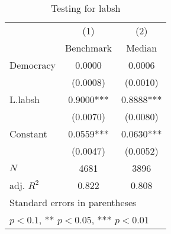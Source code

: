 \begin{table}[htbp]\centering
\def\sym#1{\ifmmode^{#1}\else\(^{#1}\)\fi}
\caption{Testing for labsh \label{tab:regression9}}
\begin{tabular}{l*{2}{c}}
\hline\hline
            &\multicolumn{1}{c}{(1)}&\multicolumn{1}{c}{(2)}\\
            &\multicolumn{1}{c}{Benchmark}&\multicolumn{1}{c}{Median}\\
\hline
Democracy   &      0.0000   &      0.0006   \\
            &    (0.0008)   &    (0.0010)   \\
[1em]
L.labsh     &      0.9000***&      0.8888***\\
            &    (0.0070)   &    (0.0080)   \\
[1em]
Constant    &      0.0559***&      0.0630***\\
            &    (0.0047)   &    (0.0052)   \\
\hline
\(N\)       &        4681   &        3896   \\
adj. \(R^{2}\)&       0.822   &       0.808   \\
\hline\hline
\multicolumn{3}{l}{\footnotesize Standard errors in parentheses}\\
\multicolumn{3}{l}{\footnotesize * \(p<0.1\), ** \(p<0.05\), *** \(p<0.01\)}\\
\end{tabular}
\end{table}
